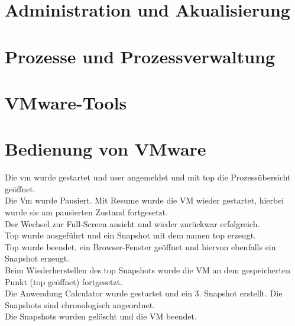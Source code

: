 \documentclass[12pt]{article}
\theoremstyle{plain}
\begin{document}
\begin{linenumbers}
\section{Administration und Akualisierung}
\section{Prozesse und Prozessverwaltung}
\section{VMware-Tools}
\section{Bedienung von VMware}
Die vm wurde gestartet und user angemeldet und mit top die Prozessübersicht geöffnet.\\
Die Vm wurde Pausiert. Mit Resume wurde die VM wieder gestartet, hierbei wurde sie am pausierten Zustand fortgesetzt.\\
Der Wechsel zur Full-Screen ansicht und wieder zurückwar erfolgreich.\\
Top wurde ausgeführt und ein Snapshot mit dem namen top erzeugt.\\
Top wurde beendet, ein Browser-Fenster geöffnet und hiervon ebenfalls ein Snapshot erzeugt.\\
Beim Wiederherstellen des top Snapshots wurde die VM an dem gespeicherten Punkt (top geöffnet) fortgesetzt.\\
Die Anwendung Calculator wurde gestartet und ein 3. Snapshot erstellt. Die Snapshots sind chronologisch angeordnet.\\
Die Snapshots wurden gelöscht und die VM beendet.
\end{linenumbers}
\end{document}
